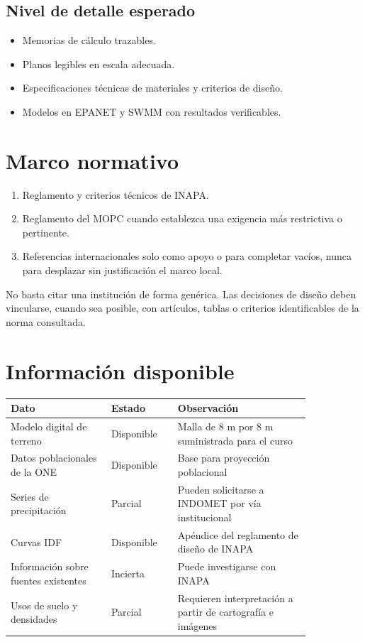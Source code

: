 \documentclass[11pt]{article}
\begin{document}
\subsection{Nivel de detalle esperado}
\begin{itemize}
\item Memorias de c\'alculo trazables.
\item Planos legibles en escala adecuada.
\item Especificaciones t\'ecnicas de materiales y criterios de dise\~no.
\item Modelos en EPANET y SWMM con resultados verificables.
\end{itemize}

\section{Marco normativo}
\begin{enumerate}
\item Reglamento y criterios t\'ecnicos de INAPA.
\item Reglamento del MOPC cuando establezca una exigencia m\'as restrictiva o pertinente.
\item Referencias internacionales solo como apoyo o para completar vac\'ios, nunca para desplazar sin justificaci\'on el marco local.
\end{enumerate}

\begin{warnbox}
No basta citar una instituci\'on de forma gen\'erica. Las decisiones de dise\~no deben vincularse, cuando sea posible, con art\'iculos, tablas o criterios identificables de la norma consultada.
\end{warnbox}

\section{Informaci\'on disponible}
\begin{center}
\begin{tabular}{p{0.29\linewidth} p{0.18\linewidth} p{0.37\linewidth}}
\toprule
\textbf{Dato} & \textbf{Estado} & \textbf{Observaci\'on} \\
\midrule
Modelo digital de terreno & Disponible & Malla de 8 m por 8 m suministrada para el curso \\
Datos poblacionales de la ONE & Disponible & Base para proyecci\'on poblacional \\
Series de precipitaci\'on & Parcial & Pueden solicitarse a INDOMET por v\'ia institucional \\
Curvas IDF & Disponible & Ap\'endice del reglamento de dise\~no de INAPA \\
Informaci\'on sobre fuentes existentes & Incierta & Puede investigarse con INAPA \\
Usos de suelo y densidades & Parcial & Requieren interpretaci\'on a partir de cartograf\'ia e im\'agenes \\
\bottomrule
\end{tabular}
\end{center}
\end{document}
